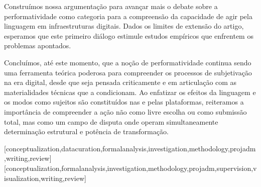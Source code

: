 \documentclass[portuguese]{textolivre}
\begin{document}
Construímos nossa argumentação para avançar mais o debate sobre a performatividade como categoria para a compreensão da capacidade de agir pela linguagem em infraestruturas digitais. Dados os limites de extensão do artigo, esperamos que este primeiro diálogo estimule estudos empíricos que enfrentem os problemas apontados.

Concluímos, até este momento, que a noção de performatividade continua sendo uma ferramenta teórica poderosa para compreender os processos de subjetivação na era digital, desde que seja pensada criticamente e em articulação com as materialidades técnicas que a condicionam. Ao enfatizar os efeitos da linguagem e os modos como sujeitos são constituídos nas e pelas plataformas, reiteramos a importância de compreender a ação não como livre escolha ou como submissão total, mas como um campo de disputa onde operam simultaneamente determinação estrutural e potência de transformação.


\printbibliography\label{sec-bib}


\begin{contributors}
[conceptualization,datacuration,formalanalysis,investigation,methodology,projadm,writing,review]
[conceptualization,formalanalysis,investigation,methodology,projadm,supervision,visualization,writing,review]
\end{contributors}


\begin{dataavailability}
\end{dataavailability}
\end{document}
